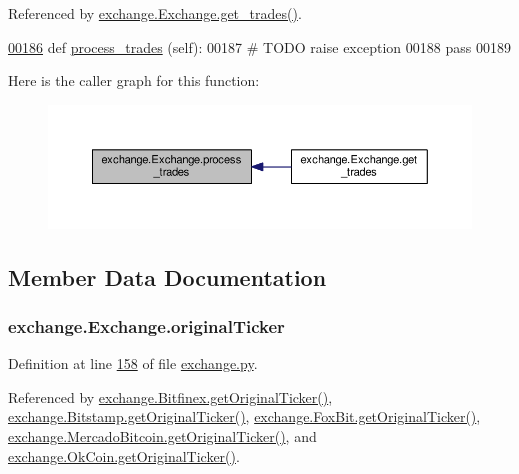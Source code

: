 Referenced by \hyperlink{exchange_8py_source_l00190}{exchange.\+Exchange.\+get\+\_\+trades()}.


\begin{DoxyCode}
\hypertarget{classexchange_1_1_exchange.tex_l00186}{}\hyperlink{classexchange_1_1_exchange_a0e67454c7053807302be914376790484}{00186}     \textcolor{keyword}{def }\hyperlink{classexchange_1_1_exchange_a0e67454c7053807302be914376790484}{process\_trades} (self):
00187         \textcolor{comment}{# TODO raise exception}
00188         \textcolor{keywordflow}{pass}
00189     
\end{DoxyCode}


Here is the caller graph for this function\+:\nopagebreak
\begin{figure}[H]
\begin{center}
\leavevmode
\includegraphics[width=350pt]{classexchange_1_1_exchange_a0e67454c7053807302be914376790484_icgraph}
\end{center}
\end{figure}




\subsection{Member Data Documentation}
\subsubsection[{\texorpdfstring{original\+Ticker}{originalTicker}}]{\setlength{\rightskip}{0pt plus 5cm}exchange.\+Exchange.\+original\+Ticker}\hypertarget{classexchange_1_1_exchange_ae326ce8c325672f3f555af59f22fd9f6}{}\label{classexchange_1_1_exchange_ae326ce8c325672f3f555af59f22fd9f6}


Definition at line \hyperlink{exchange_8py_source_l00158}{158} of file \hyperlink{exchange_8py_source}{exchange.\+py}.



Referenced by \hyperlink{exchange_8py_source_l00369}{exchange.\+Bitfinex.\+get\+Original\+Ticker()}, \hyperlink{exchange_8py_source_l00438}{exchange.\+Bitstamp.\+get\+Original\+Ticker()}, \hyperlink{exchange_8py_source_l00503}{exchange.\+Fox\+Bit.\+get\+Original\+Ticker()}, \hyperlink{exchange_8py_source_l00572}{exchange.\+Mercado\+Bitcoin.\+get\+Original\+Ticker()}, and \hyperlink{exchange_8py_source_l00631}{exchange.\+Ok\+Coin.\+get\+Original\+Ticker()}.

